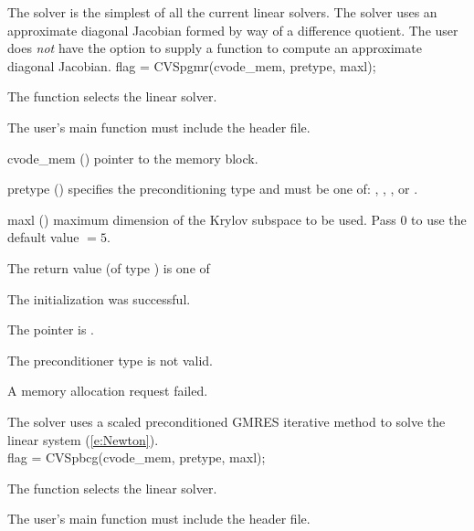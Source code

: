 {
  The {\cvdiag} solver is the simplest of all the current {\cvode} linear solvers. 
  The {\cvdiag} solver uses an approximate diagonal Jacobian formed by way of a
  difference quotient. The user does {\em not} have the option to supply a
  function to compute an approximate diagonal Jacobian.
}
{
  flag = CVSpgmr(cvode\_mem, pretype, maxl);
}
{
  The function  selects the {\cvspgmr} linear solver. 

  The user's main function must include the  header file.
}
{
  \begin{args}
  \item[cvode\_mem] ()
    pointer to the {\cvode} memory block.
  \item[pretype] ()
    specifies the preconditioning type and must be one of: 
    , , , or .
  \item[maxl] ()
    maximum dimension of the Krylov subspace to be used. Pass $0$ to use the 
    default value  $= 5$.
  \end{args}
}
{
  The return value  (of type ) is one of
  \begin{args}
  \item[\Id{CVSPGMR\_SUCCESS}] 
    The {\cvspgmr} initialization was successful.
  \item[\Id{CVSPGMR\_MEM\_NULL}]
    The  pointer is .
  \item[\Id{CVSPGMR\_ILL\_INPUT}]
    The preconditioner type  is not valid.
  \item[\Id{CVSPGMR\_MEM\_FAIL}]
    A memory allocation request failed.
  \end{args}
}
{
  The {\cvspgmr} solver uses a scaled preconditioned GMRES
  iterative method to solve the linear system (\ref{e:Newton}).\\
}
{
  flag = CVSpbcg(cvode\_mem, pretype, maxl);
}
{
  The function  selects the {\cvspbcg} linear solver. 

  The user's main function must include the  header file.
}
